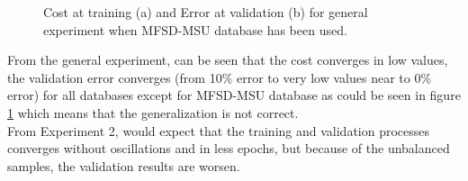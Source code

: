 \begin{figure}[htb]
\centering
{}
\caption{Cost at training (a) and Error at validation (b) for general experiment when MFSD-MSU database has been used.}
 \label{fig:mfsd-ejec1}
\end{figure}




From the general experiment, can be seen that the cost converges in low values, the validation error converges (from 10\% error to very low values near to 0\% error) for all databases except for MFSD-MSU database as could be seen in figure \ref{fig:mfsd-ejec1} which means that the generalization is not correct. \\

From Experiment 2, would expect that the training and validation processes converges without oscillations and in less epochs, but because of the unbalanced samples, the validation results are worsen.\\

